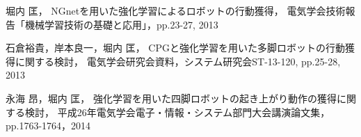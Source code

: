 \documentclass{jarticle}
\begin{document}
\begin{thebibliography}{99}

堀内 匡，
NGnetを用いた強化学習によるロボットの行動獲得，
電気学会技術報告「機械学習技術の基礎と応用」，pp.23-27, 2013

石倉裕貴，岸本良一，堀内 匡，
CPGと強化学習を用いた多脚ロボットの行動獲得に関する検討，
電気学会研究会資料，システム研究会ST-13-120, pp.25-28, 2013

永海 昂，堀内 匡，
強化学習を用いた四脚ロボットの起き上がり動作の獲得に関する検討，
平成26年電気学会電子・情報・システム部門大会講演論文集，pp.1763-1764，2014

\end{thebibliography}
\end{document}
